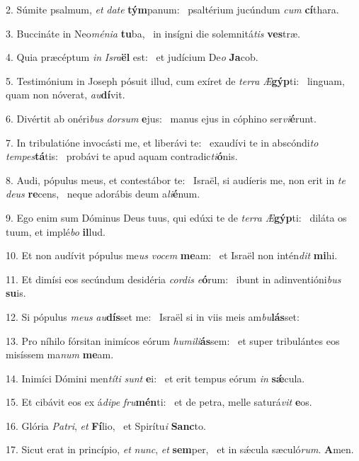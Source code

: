 2. Súmite psalmum, \textit{et} \textit{da}\textit{te} \textbf{tým}panum: \ast\  psaltérium jucúndum \textit{cum} \textbf{cí}thara.\

3. Buccináte in Neo\textit{mé}\textit{ni}\textit{a} \textbf{tu}ba, \ast\  in insígni die solemnitá\textit{tis} \textbf{ves}træ.\

4. Quia præcéptum \textit{in} \textit{Is}\textit{ra}\textbf{ël} est: \ast\  et judícium De\textit{o} \textbf{Ja}cob.\

5. Testimónium in Joseph pósuit illud, cum exíret de \textit{ter}\textit{ra} \textit{Æ}\textbf{gýp}ti: \ast\  linguam, quam non nóverat, \textit{au}\textbf{dí}vit.\

6. Divértit ab onéri\textit{bus} \textit{dor}\textit{sum} \textbf{e}jus: \ast\  manus ejus in cóphino ser\textit{vi}\textbf{é}runt.\

7. In tribulatióne invocásti me, et liberávi te: \dag\  exaudívi te in abscóndi\textit{to} \textit{tem}\textit{pes}\textbf{tá}tis: \ast\  probávi te apud aquam contradic\textit{ti}\textbf{ó}nis.\

8. Audi, pópulus meus, et contestábor te: \dag\  Israël, si audíeris me, non erit in \textit{te} \textit{de}\textit{us} \textbf{re}cens, \ast\  neque adorábis deum a\textit{li}\textbf{é}num.\

9. Ego enim sum Dóminus Deus tuus, qui edúxi te de \textit{ter}\textit{ra} \textit{Æ}\textbf{gýp}ti: \ast\  diláta os tuum, et implé\textit{bo} \textbf{il}lud.\

10. Et non audívit pópulus me\textit{us} \textit{vo}\textit{cem} \textbf{me}am: \ast\  et Israël non intén\textit{dit} \textbf{mi}hi.\

11. Et dimísi eos secúndum desidéria \textit{cor}\textit{dis} \textit{e}\textbf{ó}rum: \ast\  ibunt in adinventióni\textit{bus} \textbf{su}is.\

12. Si pópulus \textit{me}\textit{us} \textit{au}\textbf{dís}set me: \ast\  Israël si in viis meis am\textit{bu}\textbf{lás}set:\

13. Pro níhilo fórsitan inimícos eórum \textit{hu}\textit{mi}\textit{li}\textbf{ás}sem: \ast\  et super tribulántes eos misíssem ma\textit{num} \textbf{me}am.\

14. Inimíci Dómini men\textit{tí}\textit{ti} \textit{sunt} \textbf{e}i: \ast\  et erit tempus eórum \textit{in} \textbf{sǽ}cula.\

15. Et cibávit eos ex á\textit{di}\textit{pe} \textit{fru}\textbf{mén}ti: \ast\  et de petra, melle saturá\textit{vit} \textbf{e}os.\

16. Glória \textit{Pa}\textit{tri}, \textit{et} \textbf{Fí}lio, \ast\  et Spirítu\textit{i} \textbf{Sanc}to.\

17. Sicut erat in princípio, \textit{et} \textit{nunc}, \textit{et} \textbf{sem}per, \ast\  et in sǽcula sæculó\textit{rum}. \textbf{A}men.\

